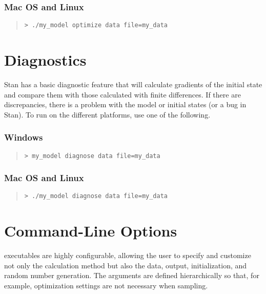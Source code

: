 \subsubsection{Mac OS and Linux}
%
\begin{quote}
\begin{Verbatim}[fontshape=sl]
> ./my_model optimize data file=my_data
\end{Verbatim}
\end{quote}



\section{Diagnostics}\label{diagnostics.section}

Stan has a basic diagnostic feature that will calculate gradients of
the initial state and compare them with those calculated with finite
differences.  If there are discrepancies, there is a problem with the
model or initial states (or a bug in Stan).  To run on the different
platforms, use one of the following.

\subsubsection{Windows}
%
\begin{quote}
\begin{Verbatim}[fontshape=sl]
> my_model diagnose data file=my_data
\end{Verbatim}
\end{quote}

\subsubsection{Mac OS and Linux}
%
\begin{quote}
\begin{Verbatim}[fontshape=sl]
> ./my_model diagnose data file=my_data
\end{Verbatim}
\end{quote}




\section{Command-Line Options}\label{stan-command-line-options.section}

\Stan executables are highly configurable, allowing the user to specify
and customize not only the calculation method but also the data, output,
initialization, and random number generation.  The arguments are defined
hierarchically so that, for example, optimization settings are not necessary
when sampling.  

